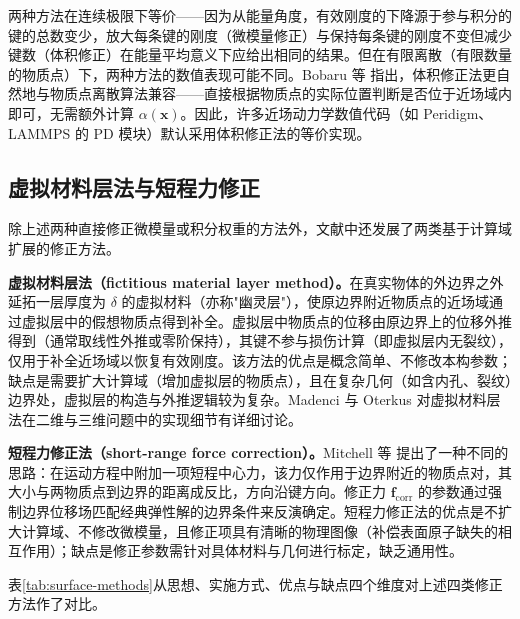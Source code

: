 两种方法在连续极限下等价——因为从能量角度，有效刚度的下降源于参与积分的键的总数变少，放大每条键的刚度（微模量修正）与保持每条键的刚度不变但减少键数（体积修正）在能量平均意义下应给出相同的结果。但在有限离散（有限数量的物质点）下，两种方法的数值表现可能不同。Bobaru 等 \cite{Bobaru2016} 指出，体积修正法更自然地与物质点离散算法兼容——直接根据物质点的实际位置判断是否位于近场域内即可，无需额外计算 $\alpha(\mathbf{x})$。因此，许多近场动力学数值代码（如 Peridigm、LAMMPS 的 PD 模块）默认采用体积修正法的等价实现。

\subsection{虚拟材料层法与短程力修正}

除上述两种直接修正微模量或积分权重的方法外，文献中还发展了两类基于计算域扩展的修正方法。

\textbf{虚拟材料层法（fictitious material layer method）。}在真实物体的外边界之外延拓一层厚度为 $\delta$ 的虚拟材料（亦称"幽灵层"），使原边界附近物质点的近场域通过虚拟层中的假想物质点得到补全。虚拟层中物质点的位移由原边界上的位移外推得到（通常取线性外推或零阶保持），其键不参与损伤计算（即虚拟层内无裂纹），仅用于补全近场域以恢复有效刚度。该方法的优点是概念简单、不修改本构参数；缺点是需要扩大计算域（增加虚拟层的物质点），且在复杂几何（如含内孔、裂纹）边界处，虚拟层的构造与外推逻辑较为复杂。Madenci 与 Oterkus \cite{MadenciOterkus2014} 对虚拟材料层法在二维与三维问题中的实现细节有详细讨论。

\textbf{短程力修正法（short-range force correction）。}Mitchell 等 \cite{Mitchell2015} 提出了一种不同的思路：在运动方程中附加一项短程中心力，该力仅作用于边界附近的物质点对，其大小与两物质点到边界的距离成反比，方向沿键方向。修正力 $\mathbf{f}_{\mathrm{corr}}$ 的参数通过强制边界位移场匹配经典弹性解的边界条件来反演确定。短程力修正法的优点是不扩大计算域、不修改微模量，且修正项具有清晰的物理图像（补偿表面原子缺失的相互作用）；缺点是修正参数需针对具体材料与几何进行标定，缺乏通用性。

表\ref{tab:surface-methods}从思想、实施方式、优点与缺点四个维度对上述四类修正方法作了对比。

